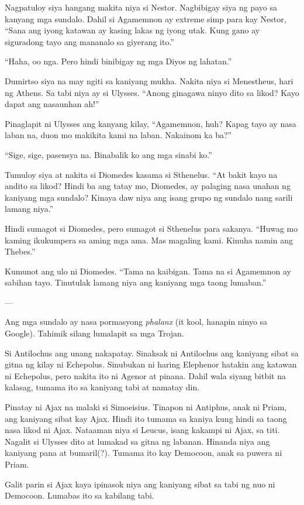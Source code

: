 \documentclass[12pt,letterpaper]{report}
\begin{document}
Nagpatuloy siya hangang makita niya si Nestor. Nagbibigay siya ng payo sa kanyang mga sundalo. Dahil si Agamemnon ay extreme simp para kay Nestor, ``Sana ang iyong katawan ay kasing lakas ng iyong utak. Kung gano ay siguradong tayo ang mananalo sa giyerang ito.''

``Haha, oo nga. Pero hindi binibigay ng mga Diyos ng lahatan.''

Dumirtso siya na may ngiti sa kaniyang mukha. Nakita niya si Menestheus, hari ng Athens. Sa tabi niya ay si Ulysses. ``Anong ginagawa ninyo dito sa likod? Kayo dapat ang nasaunhan ah!''

Pinaglapit ni Ulysses ang kanyang kilay, ``Agamemnon, huh? Kapag tayo ay nasa laban na, duon mo makikita kami na laban. Nakainom ka ba?''

``Sige, sige, pasensya na. Binabalik ko ang mga sinabi ko.''

Tumuloy siya at nakita si Diomedes kasama si Sthenelus. ``At bakit kayo na andito sa likod? Hindi ba ang tatay mo, Diomedes, ay palaging nasa unahan ng kaniyang mga sundalo? Kinaya daw niya ang isang grupo ng sundalo nang sarili lamang niya.''

Hindi sumagot si Diomedes, pero sumagot si Sthenelus para sakanya. ``Huwag mo kaming ikukumpera sa aming mga ama. Mas magaling kami. Kinuha namin ang Thebes.''

Kumunot ang ulo ni Diomedes. ``Tama na kaibigan. Tama na si Agamemnon ay sabihan tayo. Tinutulak lamang niya ang kaniyang mga taong lumaban.''

---

Ang mga sundalo ay nasa pormasyong \textit{phalanx} (it kool, hanapin ninyo sa Google). Tahimik silang lumalapit sa mga Trojan.

Si Antilochus ang unang nakapatay. Sinaksak ni Antilochus ang kaniyang sibat sa gitna ng kilay ni Echepolus. Sinubukan ni haring Elephenor hatakin ang katawan ni Echepolus, pero nakita ito ni Agenor at pinana. Dahil wala siyang bitbit na kalasag, tumama ito sa kaniyang tabi at namatay din.

Pinatay ni Ajax na malaki si Simoeisius. Tinapon ni Antiphus, anak ni Priam, ang kaniyang sibat kay Ajax. Hindi ito tumama sa kaniya kung hindi sa taong nasa likod ni Ajax. Nataaman niya si Leucus, isang kakampi ni Ajax, sa titi. Nagalit si Ulysses dito at lumakad sa gitna ng labanan. Hinanda niya ang kaniyang pana at bumaril(?). Tumama ito kay Democoon, anak sa puwera ni Priam.

Galit parin si Ajax kaya ipinasok niya ang kaniyang sibat sa tabi ng nuo ni Democoon. Lumabas ito sa kabilang tabi.
\end{document}
